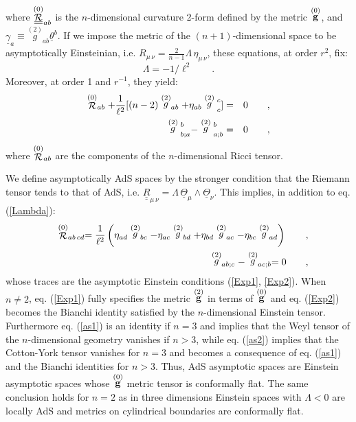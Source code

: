 \documentclass[a4paper,10pt]{article}
\begin{document}
where $ \stackrel {(0)} {\underline{\underline {\cal R}}} _{ a b}$  
is the $n$-dimensional curvature 2-form 
defined by the metric $\stackrel {(0)}{\bf g}$, 
and $\underline{\gamma}_{ a} 
\equiv \stackrel {(2)} g _{ a  b}\underline{\theta}^{ b}$. 
If we impose the metric of the $(n+1)$-dimensional space 
to be asymptotically Einsteinian, i.e.  
$R_{\mu\,\nu}=\frac 2{n-1}\Lambda\, \eta_{\mu\,\nu}$,  
these equations, at order $r^2$, fix: 
\begin{equation} 
\Lambda = -1/\ell^2\qquad.\label{Lambda} 
\end{equation}  
Moreover, at order 1 and $r^{-1}$, they yield: 
\begin{eqnarray} 
\label{Exp1} 
\stackrel {(0)} {\cal{R}}_{ a  b} + {1\over{\ell^2}} [(n-2) 
\stackrel {(2)}g_{  a   b} +  
\eta _{  a   b} \stackrel {(2)}g \strut _{ c}^{ c}] & = & 0 \qquad ,\\ 
\label{Exp2} 
 \stackrel {(2)} g \strut  ^{ b}_{ b ; a} -  
 \stackrel {(2)} g \strut ^{ b}_{ a; b} & = & 0 \qquad , 
\end{eqnarray} 
where $\stackrel {(0)}{\cal R}_{ a  b}$ are the components of the $n$-dimensional Ricci  
tensor. 
 
We define asymptotically AdS spaces by the stronger condition that the Riemann 
tensor tends to that of AdS, i.e. $\underline{\underline R}_{\mu\,\nu} = 
 \Lambda\, \underline{\Theta}_{ \mu} \wedge 
\underline{\Theta}_{\nu}$. This implies, in addition to eq. (\ref{Lambda}): 
\begin{eqnarray} 
& &\stackrel {(0)} {\cal{R}}_{ a  b\,cd} =\frac1{\ell^2}\left( 
\eta_{ad}\stackrel {(2)}g_{  bc}-\eta_{ac}\stackrel {(2)}g_{  bd}+ 
\eta_{bd}\stackrel {(2)}g_{  ac}-\eta_{bc}\stackrel {(2)}g_{  ad} 
\right)\qquad ,\label{as1}\\ 
& &\stackrel {(2)} g_{a b ; c} -  
 \stackrel {(2)} g_{ ac; b}  =  0 \qquad ,\label{as2} 
\end{eqnarray} 
whose traces are the asymptotic Einstein conditions (\ref{Exp1}, \ref{Exp2}). 
When $n \neq 2$, 
eq. (\ref{Exp1}) fully specifies the metric $\stackrel {(2)}{\bf g}$  
in terms of $\stackrel {(0)}{\bf g}$ and  
eq. (\ref{Exp2}) 
becomes the Bianchi identity satisfied by the $n$-dimensional Einstein  
tensor. Furthermore eq. (\ref{as1}) is an identity if $n=3$ and implies that 
 the Weyl tensor of the $n$-dimensional geometry vanishes if $n>3$, while 
 eq. (\ref{as2}) implies that the Cotton-York tensor vanishes for $n=3$ and 
 becomes a consequence of eq. (\ref{as1}) and the Bianchi identities for 
 $n>3$. Thus, AdS asymptotic spaces are Einstein asymptotic spaces whose 
 $\stackrel {(0)}{\bf g}$  metric tensor  is conformally flat. 
The same conclusion holds for $n=2$ as in three dimensions Einstein spaces 
 with $\Lambda <0$ are  
locally AdS and metrics on cylindrical boundaries are conformally flat. 
 
\end{document}
